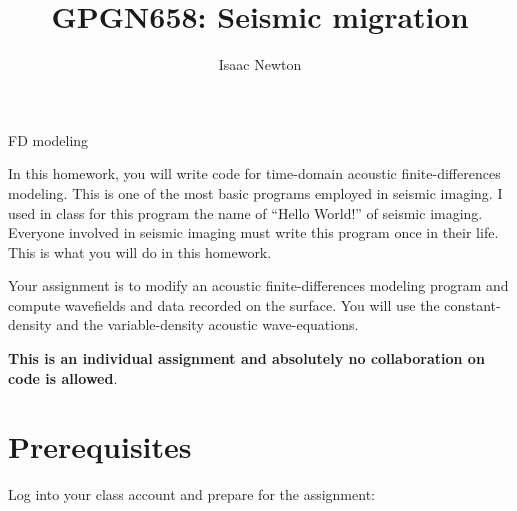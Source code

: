 \author{Isaac Newton}
\title{GPGN658: Seismic migration}{FD modeling}

In this homework, you will write code for time-domain acoustic
finite-differences modeling. This is one of the most basic programs
employed in seismic imaging. I used in class for this program the name
of ``Hello World!'' of seismic imaging. Everyone involved in seismic
imaging must write this program once in their life. This is what you
will do in this homework.

Your assignment is to modify an acoustic finite-differences modeling
program and compute wavefields and data recorded on the surface. You
will use the constant-density and the variable-density acoustic
wave-equations.

\textbf{This is an individual assignment and absolutely no collaboration
on code is allowed}.

\section{Prerequisites}

Log into your class account and prepare for the assignment:

